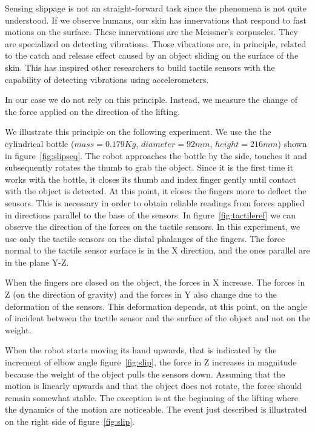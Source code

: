 
Sensing slippage is not an straight-forward task since the
phenomena is not quite understood. If we observe humans, our skin
has innervations that respond to fast motions on the surface.
These innervations are the Meissner's corpuscles. They are
specialized on detecting vibrations. Those vibrations are, in
principle, related to the catch and release effect caused by an
object sliding on the surface of the skin. This has inspired other
researchers to build tactile sensors with the capability of
detecting vibrations using accelerometers\cite{howe89sensing}.

In our case we do not rely on this principle. Instead, we measure
the change of the force applied on the direction of the lifting.

We illustrate this principle on the following experiment. We use
the the cylindrical bottle ($mass=0.179 Kg$, $diameter=92 mm$,
$height=216 mm$) shown in figure~\ref{fig:slipseq}. The robot
approaches the bottle by the side, touches it and subsequently
rotates the thumb to grab the object. Since it is the first time
it works with the bottle, it closes its thumb and index finger
gently until contact with the object is detected. At this point,
it closes the fingers more to deflect the sensors. This is
necessary in order to obtain reliable readings from forces applied
in directions parallel to the base of the sensors. In
figure~\ref{fig:tactileref} we can observe the direction of the
forces on the tactile sensors. In this experiment, we use only the
tactile sensors on the distal phalanges of the fingers. The force
normal to the tactile sensor surface is in the X direction, and
the ones parallel are in the plane Y-Z.

When the fingers are closed on the object, the forces in X
increase. The forces in Z (on the direction of gravity) and the
forces in Y also change due to the deformation of the sensors.
This deformation depends, at this point, on the angle of incident
between the tactile sensor and the surface of the object and not
on the weight.

When the robot starts moving its hand upwards, that is indicated
by the increment of elbow angle figure~\ref{fig:slip}, the force
in Z increases in magnitude because the weight of the object pulls
the sensors down. Assuming that the motion is linearly upwards and
that the object does not rotate, the force should remain somewhat
stable. The exception is at the beginning of the lifting where the
dynamics of the motion are noticeable. The event just described is
illustrated on the right side of figure~\ref{fig:slip}.

